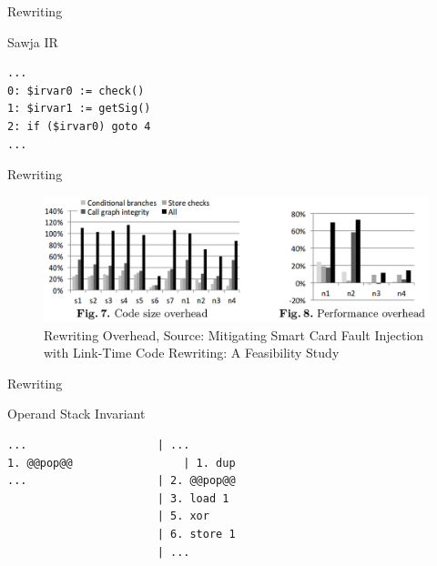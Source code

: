 \begin{frame}[fragile]{Rewriting}{}
\begin{block}{Sawja IR}
\begin{lstlisting}[numbers=none, moredelim={[is][keywordstyle]{@@}{@@}}]                  
...
0: $irvar0 := check() 
1: $irvar1 := getSig()
2: if ($irvar0) goto 4
...
\end{lstlisting}  
\end{block}  
\end{frame}

\begin{frame}{Rewriting}{}
\begin{figure}
  \centering
  \includegraphics[width=\textwidth]{rewritingOverhead}
  \caption{Rewriting Overhead, Source: Mitigating Smart Card Fault Injection with Link-Time Code Rewriting: A Feasibility Study}
\end{figure}
\end{frame}

\begin{frame}[fragile]{Rewriting}{}
\begin{block}{Operand Stack Invariant}
\begin{lstlisting}[numbers=none, moredelim={[is][keywordstyle]{@@}{@@}}]                  
...                    | ...
1. @@pop@@                 | 1. dup
...                    | 2. @@pop@@
                       | 3. load 1
                       | 5. xor
                       | 6. store 1
                       | ...
                     
\end{lstlisting}
\end{block}  
\end{frame}
